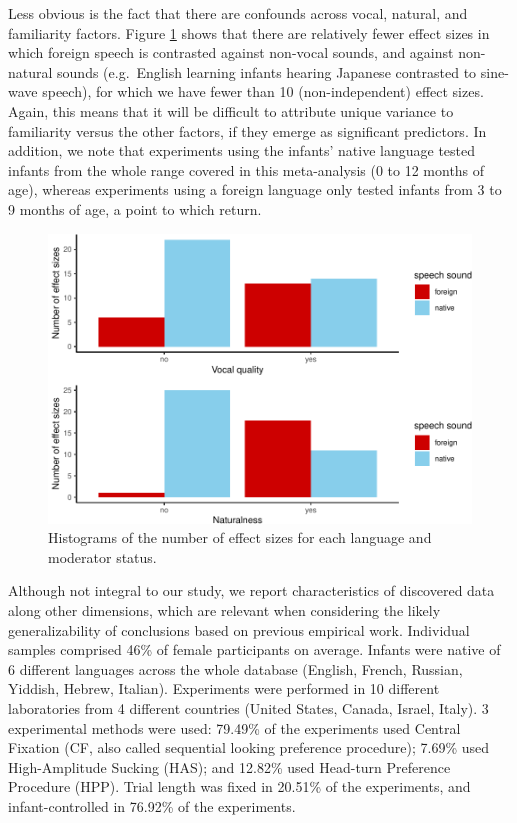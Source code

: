 \documentclass[
  man,mask,floatsintext]{apa6}
\begin{document}
Less obvious is the fact that there are confounds across vocal, natural, and familiarity factors. Figure \ref{fig:stimuli} shows that there are relatively fewer effect sizes in which foreign speech is contrasted against non-vocal sounds, and against non-natural sounds (e.g.~English learning infants hearing Japanese contrasted to sine-wave speech), for which we have fewer than 10 (non-independent) effect sizes. Again, this means that it will be difficult to attribute unique variance to familiarity versus the other factors, if they emerge as significant predictors. In addition, we note that experiments using the infants' native language tested infants from the whole range covered in this meta-analysis (0 to 12 months of age), whereas experiments using a foreign language only tested infants from 3 to 9 months of age, a point to which return.

\begin{figure}
\centering
\includegraphics{MA_speech_pref_files/figure-latex/stimuli-1.pdf}
\caption{\label{fig:stimuli}Histograms of the number of effect sizes for each language and moderator status.}
\end{figure}

Although not integral to our study, we report characteristics of discovered data along other dimensions, which are relevant when considering the likely generalizability of conclusions based on previous empirical work. Individual samples comprised 46\% of female participants on average. Infants were native of 6 different languages across the whole database (English, French, Russian, Yiddish, Hebrew, Italian).
Experiments were performed in 10 different laboratories from 4 different countries (United States, Canada, Israel, Italy). 3 experimental methods were used: 79.49\% of the experiments used Central Fixation (CF, also called sequential looking preference procedure); 7.69\% used High-Amplitude Sucking (HAS); and 12.82\% used Head-turn Preference Procedure (HPP). Trial length was fixed in 20.51\% of the experiments, and infant-controlled in 76.92\% of the experiments.
\end{document}
